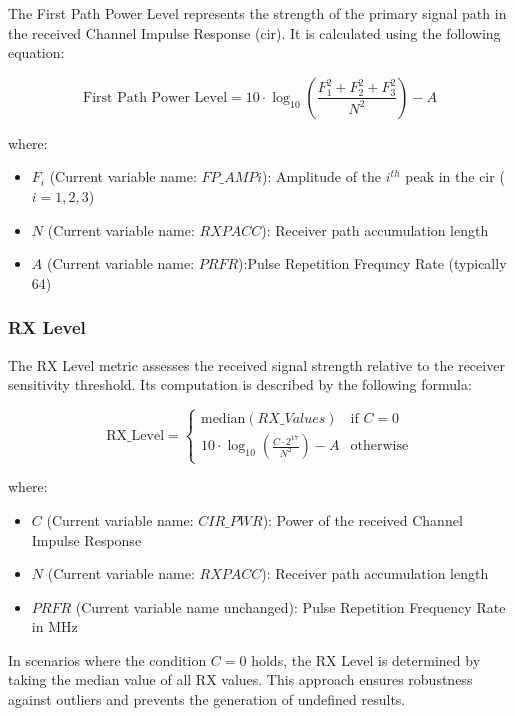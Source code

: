 The First Path Power Level represents the strength of the primary signal path in the received Channel Impulse Response (\acrshort{cir}). It is calculated using the following equation:

\begin{equation}
  \text{First Path Power Level} = 10 \cdot \log_{10} \left( \frac{F_1^2 + F_2^2 + F_3^2}{N^2} \right) - A
\end{equation}

where:

\begin{itemize}
  \item $F_i$ (Current variable name: $FP\_AMPi$): Amplitude of the $i^{th}$ peak in the \acrshort{cir} ($i = 1, 2, 3$)
  \item $N$ (Current variable name: $RXPACC$): Receiver path accumulation length
  \item $A$ (Current variable name: $PRFR$):Pulse Repetition Frequncy Rate (typically 64)
\end{itemize}

\subsubsection{RX Level}\label{rx_level}

The RX Level metric assesses the received signal strength relative to the receiver sensitivity threshold. Its computation is described by the following formula:

\begin{equation}
  \text{RX\_Level} =
  \begin{cases}
    \text{median}(RX\_Values) & \text{if } C = 0 \\
    10 \cdot \log_{10} \left( \frac{C \cdot 2^{17}}{N^2} \right) - A & \text{otherwise}
  \end{cases}
\end{equation}

where:

\begin{itemize}
  \item $C$ (Current variable name: $CIR\_PWR$): Power of the received Channel Impulse Response
  \item $N$ (Current variable name: $RXPACC$): Receiver path accumulation length
  \item $PRFR$ (Current variable name unchanged): Pulse Repetition Frequency Rate in MHz
\end{itemize}

In scenarios where the condition $C = 0$ holds, the RX Level is determined by taking the median value of all RX values. This approach ensures robustness against outliers and prevents the generation of undefined results.


